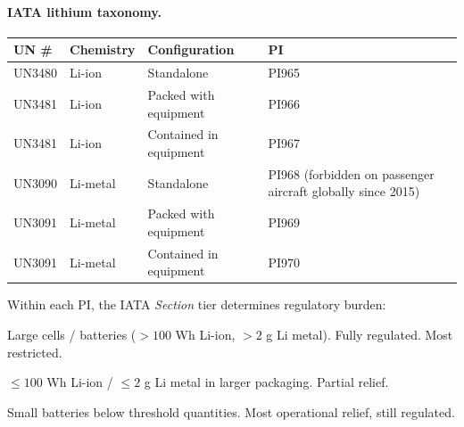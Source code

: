 \documentclass[11pt,a4paper]{article}
\theoremstyle{definition}
\begin{document}
\paragraph{IATA lithium taxonomy.}
\begin{center}
\begin{tabular}{llp{4.2cm}l}
\toprule
UN \# & Chemistry & Configuration & PI \\
\midrule
UN3480 & Li-ion    & Standalone & PI965 \\
UN3481 & Li-ion    & Packed with equipment & PI966 \\
UN3481 & Li-ion    & Contained in equipment & PI967 \\
UN3090 & Li-metal  & Standalone & PI968 \quad (forbidden on passenger aircraft globally since 2015) \\
UN3091 & Li-metal  & Packed with equipment & PI969 \\
UN3091 & Li-metal  & Contained in equipment & PI970 \\
\bottomrule
\end{tabular}
\end{center}

Within each PI, the IATA \emph{Section} tier determines regulatory burden:
\begin{description}[leftmargin=2cm, labelwidth=1.8cm, style=nextline]
  \item[Section IA] Large cells / batteries (\(>100\) Wh Li-ion, \(>2\) g Li metal).
                    Fully regulated. Most restricted.
  \item[Section IB] \(\leq 100\) Wh Li-ion / \(\leq 2\) g Li metal in larger
                    packaging. Partial relief.
  \item[Section II] Small batteries below threshold quantities. Most operational
                    relief, still regulated.
\end{description}
\end{document}
